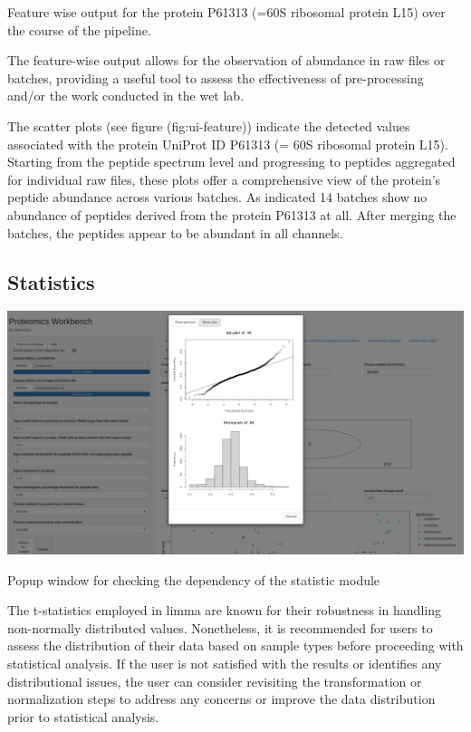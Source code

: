 \documentclass[
  11pt,
]{article}
\let\origfigure\figure
\begin{document}
\caption{Feature wise output for the protein P61313 (=60S ribosomal protein L15) over the course of the pipeline.}\label{fig:ui-feature}
 \endfigure\egroup

The feature-wise output allows for the observation of abundance in raw files or batches, providing a useful tool to assess the effectiveness of pre-processing and/or the work conducted in the wet lab.

The scatter plots (see figure (fig:ui-feature)) indicate the detected values associated with the protein UniProt ID P61313 (= 60S ribosomal protein L15). Starting from the peptide spectrum level and progressing to peptides aggregated for individual raw files, these plots offer a comprehensive view of the protein's peptide abundance across various batches. As indicated 14 batches show no abundance of peptides derived from the protein P61313 at all. After merging the batches, the peptides appear to be abundant in all channels.

\newpage

\hypertarget{statistics-1}{%
\subsection{Statistics}\label{statistics-1}}

\bgroup  \origfigure[H] 

{\centering \includegraphics[width=1\linewidth]{screenshots/stat_dependency} 

}

\caption{Popup window for checking the dependency of the statistic module}\label{fig:ui-stat-dependency}
 \endfigure\egroup

The t-statistics employed in limma are known for their robustness in handling non-normally distributed values. Nonetheless, it is recommended for users to assess the distribution of their data based on sample types before proceeding with statistical analysis. If the user is not satisfied with the results or identifies any distributional issues, the user can consider revisiting the transformation or normalization steps to address any concerns or improve the data distribution prior to statistical analysis.
\end{document}
